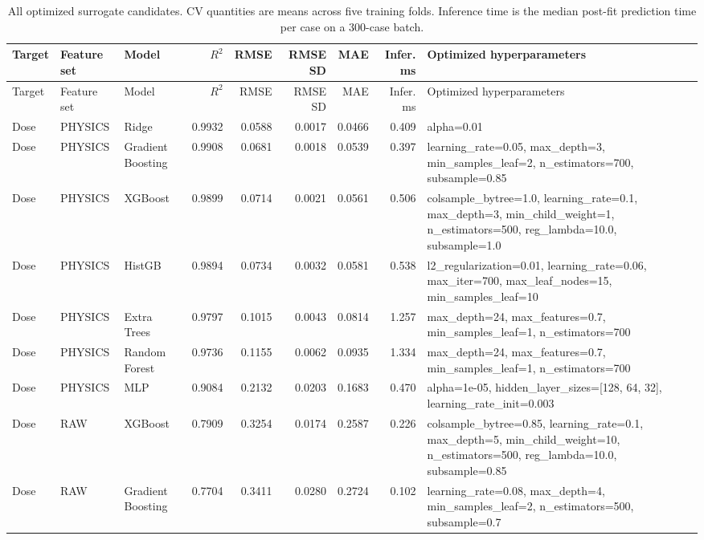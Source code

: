 \documentclass[11pt]{article}
\begin{document}
\begin{landscape}
\scriptsize
\begin{longtable}{p{}p{}p{}rrrrrp{}}
\caption{All optimized surrogate candidates. CV quantities are means across five training folds. Inference time is the median post-fit prediction time per case on a 300-case batch.}\\
\toprule Target & Feature set & Model & $R^2$ & RMSE & RMSE SD & MAE & Infer. ms & Optimized hyperparameters \\ \midrule
\endfirsthead
\toprule Target & Feature set & Model & $R^2$ & RMSE & RMSE SD & MAE & Infer. ms & Optimized hyperparameters \\ \midrule
\endhead
Dose & PHYSICS & Ridge & 0.9932 & 0.0588 & 0.0017 & 0.0466 & 0.409 & \footnotesize\ttfamily alpha=0.01 \\
Dose & PHYSICS & Gradient Boosting & 0.9908 & 0.0681 & 0.0018 & 0.0539 & 0.397 & \footnotesize\ttfamily learning\_rate=0.05, max\_depth=3, min\_samples\_leaf=2, n\_estimators=700, subsample=0.85 \\
Dose & PHYSICS & XGBoost & 0.9899 & 0.0714 & 0.0021 & 0.0561 & 0.506 & \footnotesize\ttfamily colsample\_bytree=1.0, learning\_rate=0.1, max\_depth=3, min\_child\_weight=1, n\_estimators=500, reg\_lambda=10.0, subsample=1.0 \\
Dose & PHYSICS & HistGB & 0.9894 & 0.0734 & 0.0032 & 0.0581 & 0.538 & \footnotesize\ttfamily l2\_regularization=0.01, learning\_rate=0.06, max\_iter=700, max\_leaf\_nodes=15, min\_samples\_leaf=10 \\
Dose & PHYSICS & Extra Trees & 0.9797 & 0.1015 & 0.0043 & 0.0814 & 1.257 & \footnotesize\ttfamily max\_depth=24, max\_features=0.7, min\_samples\_leaf=1, n\_estimators=700 \\
Dose & PHYSICS & Random Forest & 0.9736 & 0.1155 & 0.0062 & 0.0935 & 1.334 & \footnotesize\ttfamily max\_depth=24, max\_features=0.7, min\_samples\_leaf=1, n\_estimators=700 \\
Dose & PHYSICS & MLP & 0.9084 & 0.2132 & 0.0203 & 0.1683 & 0.470 & \footnotesize\ttfamily alpha=1e-05, hidden\_layer\_sizes=[128, 64, 32], learning\_rate\_init=0.003 \\
Dose & RAW & XGBoost & 0.7909 & 0.3254 & 0.0174 & 0.2587 & 0.226 & \footnotesize\ttfamily colsample\_bytree=0.85, learning\_rate=0.1, max\_depth=5, min\_child\_weight=10, n\_estimators=500, reg\_lambda=10.0, subsample=0.85 \\
Dose & RAW & Gradient Boosting & 0.7704 & 0.3411 & 0.0280 & 0.2724 & 0.102 & \footnotesize\ttfamily learning\_rate=0.08, max\_depth=4, min\_samples\_leaf=2, n\_estimators=500, subsample=0.7 \\

\end{longtable}
\end{landscape}
\end{document}
